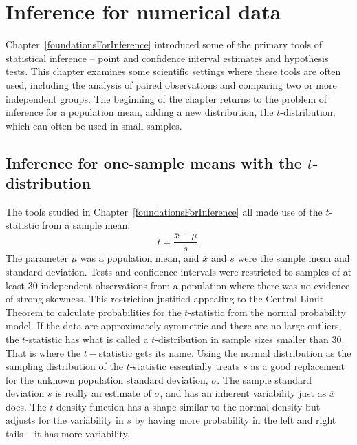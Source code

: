 
\chapter{Inference for numerical data}
\label{inferenceForNumericalData}

Chapter~\ref{foundationsForInference} introduced some of the primary tools of statistical inference -- point and confidence  interval estimates and hypothesis tests.  This chapter examines some scientific settings where these tools are often used, including the analysis of paired observations and comparing two or more independent groups.  The beginning of the chapter returns to the problem of inference for a population mean, adding a new distribution, the $t$-distribution, which can often be used in small samples. 


\section{Inference for one-sample means with the $t$-distribution}
\label{oneSampleMeansWithTDistribution}


The tools studied in Chapter~\ref{foundationsForInference} all made use of the $t$-statistic from a sample mean:
\[
   t = \frac{\overline{x} - \mu}{s}.
\]
The parameter $\mu$ was a population mean, and $\overline{x}$ and $s$ were the sample mean and standard deviation.  Tests and confidence intervals were restricted to samples of at least 30 independent observations from a population where there was no evidence of strong skewness.  This restriction justified appealing to the Central Limit Theorem to calculate probabilities for the $t$-statistic from the normal probability model. If the data are approximately symmetric and there are no large outliers, the $t$-statistic has what is called a $t$-distribution in sample sizes smaller than 30.  That is where the $t-$statistic gets its name.  Using the normal distribution as the sampling distribution of the $t$-statistic essentially treats $s$ as a good replacement for the unknown population standard deviation, $\sigma$.  The sample standard deviation $s$ is really an estimate of $\sigma$, and has an inherent variability just as $\overline{x}$ does.  The $t$ density function has a shape  similar to the normal density but adjusts for the variability in $s$ by having more probability in the left and right tails -- it has more variability.


